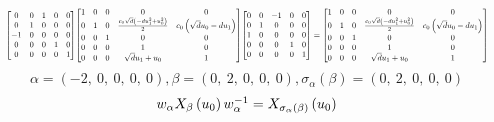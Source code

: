 \documentclass[11pt]{article}
\theoremstyle{definition}
\begin{document}
\[
\scaletoalign{\textwidth}{{\left[\begin{matrix}0 & 0 & 1 & 0 & 0\\0 & 1 & 0 & 0 & 0\\-1 & 0 & 0 & 0 & 0\\0 & 0 & 0 & 1 & 0\\0 & 0 & 0 & 0 & 1\end{matrix}\right]} {\left[\begin{matrix}1 & 0 & 0 & 0 & 0\\0 & 1 & 0 & \frac{c_{0} \sqrt{d} \left(- d u_{1}^{2} + u_{0}^{2}\right)}{2} & c_{0} \left(\sqrt{d} u_{0} - d u_{1}\right)\\0 & 0 & 1 & 0 & 0\\0 & 0 & 0 & 1 & 0\\0 & 0 & 0 & \sqrt{d} u_{1} + u_{0} & 1\end{matrix}\right]} {\left[\begin{matrix}0 & 0 & -1 & 0 & 0\\0 & 1 & 0 & 0 & 0\\1 & 0 & 0 & 0 & 0\\0 & 0 & 0 & 1 & 0\\0 & 0 & 0 & 0 & 1\end{matrix}\right]} = {\left[\begin{matrix}1 & 0 & 0 & 0 & 0\\0 & 1 & 0 & \frac{c_{0} \sqrt{d} \left(- d u_{1}^{2} + u_{0}^{2}\right)}{2} & c_{0} \left(\sqrt{d} u_{0} - d u_{1}\right)\\0 & 0 & 1 & 0 & 0\\0 & 0 & 0 & 1 & 0\\0 & 0 & 0 & \sqrt{d} u_{1} + u_{0} & 1\end{matrix}\right]}}
\]
\[
\alpha = \left( -2, \  0, \  0, \  0, \  0\right), \beta = \left( 0, \  2, \  0, \  0, \  0\right), \sigma_{\alpha}(\beta) = \left( 0, \  2, \  0, \  0, \  0\right)
\]
\[
\scaletoalign{\textwidth}{w_{\alpha} X_{\beta}\left(u_{0}\right) w_{\alpha}^{-1} = X_{\sigma_{\alpha}\left(\beta\right)}\left(u_{0}\right)}
\]
\end{document}
